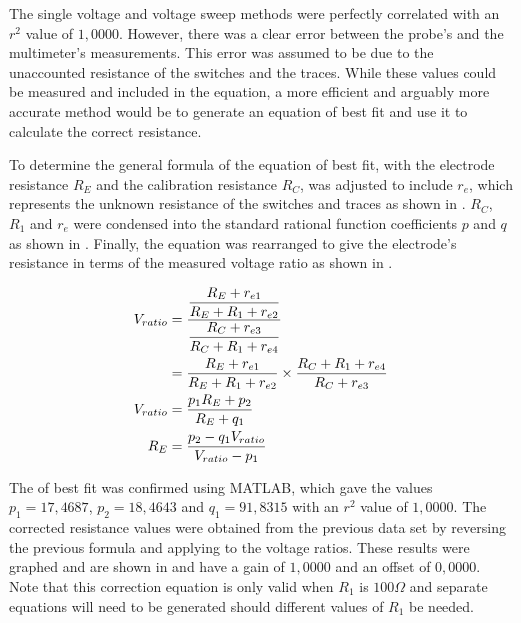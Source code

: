 The single voltage and voltage sweep methods were perfectly correlated with an $r^2$ value of $1,0000$.
However, there was a clear error between the probe's and the multimeter's measurements.
This error was assumed to be due to the unaccounted resistance of the switches and the traces.
While these values could be measured and included in the equation, a more efficient and arguably more accurate method would be to generate an equation of best fit and use it to calculate the correct resistance.

To determine the general formula of the equation of best fit,  with the electrode resistance $R_E$ and the calibration resistance $R_C$, was adjusted to include $r_e$, which represents the unknown resistance of the switches and traces as shown in .
$R_C$, $R_1$ and $r_e$ were condensed into the standard rational function coefficients $p$ and $q$ as shown in .
Finally, the equation was rearranged to give the electrode's resistance in terms of the measured voltage ratio as shown in .

\begin{align}
 V_{ratio} &= \frac{\displaystyle\frac{\displaystyle R_E + r_{e1}}{\displaystyle R_E + R_1 + r_{e2}}}{\displaystyle\frac{\displaystyle R_C + r_{e3}}{\displaystyle R_C + R_1 + r_{e4}}} \nonumber \\
    &= \frac{\displaystyle R_E + r_{e1}}{\displaystyle R_E + R_1 + r_{e2}} \times \frac{\displaystyle R_C + R_1 + r_{e4}}{\displaystyle R_C + r_{e3}} \label{eqn:resistance-measuring} \\
 V_{ratio} &= \frac{\displaystyle p_1 R_E + p_2}{\displaystyle R_E + q_1} \label{eqn:resistance-measuring-rational} \\
 R_E &= \frac{\displaystyle p_2 - q_1 V_{ratio}}{\displaystyle V_{ratio} - p_1} \label{eqn:resistance-measuring-rearranged}
\end{align}

The  of best fit was confirmed using MATLAB, which gave the values $p_1 = 17,4687$, $p_2 = 18,4643$ and $q_1 = 91,8315$ with an $r^2$ value of $1,0000$. 
The corrected resistance values were obtained from the previous data set by reversing the previous formula and applying  to the voltage ratios.
These results were graphed and are shown in  and have a gain of $1,0000$ and an offset of $0,0000$.
Note that this correction equation is only valid when $R_1$ is $100\Omega$ and separate equations will need to be generated should different values of $R_1$ be needed.

